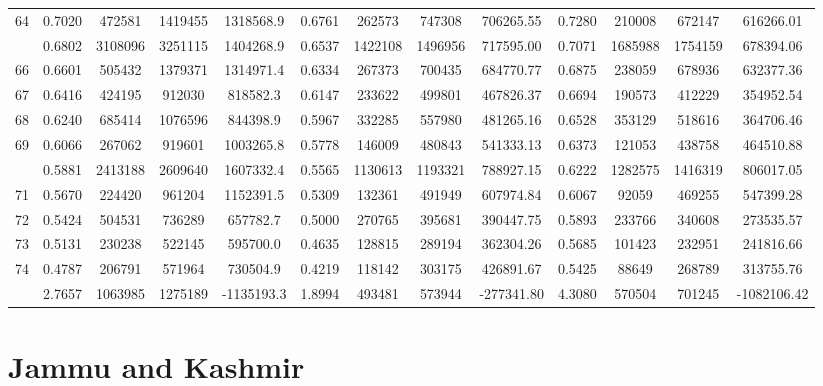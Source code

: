 \documentclass[
  12pt,
]{article}
\begin{document}
\begin{longtable}[t]{lcccccccccccc}
64 & 0.7020 & 472581 & 1419455 & 1318568.9 & 0.6761 & 262573 & 747308 & 706265.55 & 0.7280 & 210008 & 672147 & 616266.01\\
\addlinespace
65 & 0.6802 & 3108096 & 3251115 & 1404268.9 & 0.6537 & 1422108 & 1496956 & 717595.00 & 0.7071 & 1685988 & 1754159 & 678394.06\\
66 & 0.6601 & 505432 & 1379371 & 1314971.4 & 0.6334 & 267373 & 700435 & 684770.77 & 0.6875 & 238059 & 678936 & 632377.36\\
67 & 0.6416 & 424195 & 912030 & 818582.3 & 0.6147 & 233622 & 499801 & 467826.37 & 0.6694 & 190573 & 412229 & 354952.54\\
68 & 0.6240 & 685414 & 1076596 & 844398.9 & 0.5967 & 332285 & 557980 & 481265.16 & 0.6528 & 353129 & 518616 & 364706.46\\
69 & 0.6066 & 267062 & 919601 & 1003265.8 & 0.5778 & 146009 & 480843 & 541333.13 & 0.6373 & 121053 & 438758 & 464510.88\\
\addlinespace
70 & 0.5881 & 2413188 & 2609640 & 1607332.4 & 0.5565 & 1130613 & 1193321 & 788927.15 & 0.6222 & 1282575 & 1416319 & 806017.05\\
71 & 0.5670 & 224420 & 961204 & 1152391.5 & 0.5309 & 132361 & 491949 & 607974.84 & 0.6067 & 92059 & 469255 & 547399.28\\
72 & 0.5424 & 504531 & 736289 & 657782.7 & 0.5000 & 270765 & 395681 & 390447.75 & 0.5893 & 233766 & 340608 & 273535.57\\
73 & 0.5131 & 230238 & 522145 & 595700.0 & 0.4635 & 128815 & 289194 & 362304.26 & 0.5685 & 101423 & 232951 & 241816.66\\
74 & 0.4787 & 206791 & 571964 & 730504.9 & 0.4219 & 118142 & 303175 & 426891.67 & 0.5425 & 88649 & 268789 & 313755.76\\
\addlinespace
75 & 2.7657 & 1063985 & 1275189 & -1135193.3 & 1.8994 & 493481 & 573944 & -277341.80 & 4.3080 & 570504 & 701245 & -1082106.42\\*
\end{longtable}
\endgroup{}

\pagebreak

\hypertarget{jammu-and-kashmir}{%
\section{Jammu and Kashmir}\label{jammu-and-kashmir}}

\begingroup\fontsize{9.7}{11.7}\selectfont
\end{document}
